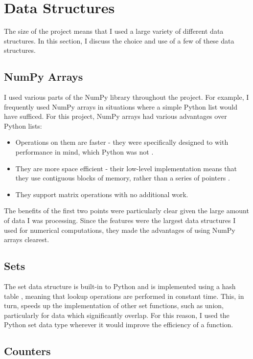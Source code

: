 \documentclass[12pt,a4paper,twoside,openright]{report}
\begin{document}
\section{Data Structures} \label{impl-structures}

The size of the project means that I used a large variety of different data structures. In this section, I discuss the choice and use of a few of these data structures.

\subsection{NumPy Arrays}

I used various parts of the NumPy library throughout the project. For example, I frequently used NumPy arrays in situations where a simple Python list would have sufficed. For this project, NumPy arrays had various advantages over Python lists:
\begin{itemize}
	\item Operations on them are faster - they were specifically designed to with performance in mind, which Python was not \cite{numpyspeed}.
	\item They are more space efficient - their low-level implementation means that they use contiguous blocks of memory, rather than a series of pointers \cite{numpymanual}.
	\item They support matrix operations with no additional work.
\end{itemize}

The benefits of the first two points were particularly clear given the large amount of data I was processing. Since the features were the largest data structures I used for numerical computations, they made the advantages of using NumPy arrays clearest.

\subsection{Sets}

The set data structure is built-in to Python and is implemented using a hash table \cite{pythonsetdocs}, meaning that lookup operations are performed in constant time. This, in turn, speeds up the implementation of other set functions, such as union, particularly for data which significantly overlap. For this reason, I used the Python set data type wherever it would improve the efficiency of a function.

\subsection{Counters} 
\end{document}
